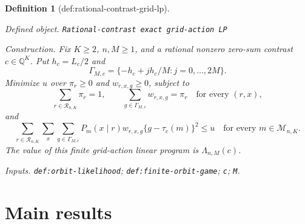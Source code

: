 \documentclass{article}
\newtheorem{definition}{Definition}
\begin{document}
\begin{definition}[def:rational-contrast-grid-lp]\label{def:rational-contrast-grid-lp}
\par\smallskip\noindent\emph{Defined object.} \texttt{Rational-\allowbreak{}contrast exact grid-\allowbreak{}action LP}
\par\smallskip\noindent\emph{Construction.} Fix \(K\geq2\), \(n,M\geq1\), and a rational nonzero zero-sum contrast \(c\in\mathbb Q^K\).  Put \(h_c=L_c/2\) and
\[
 \Gamma_{M,c}=\{-h_c+jh_c/M:j=0,\ldots,2M\}.
\]
Minimize \(u\) over \(\pi_r\geq0\) and \(w_{r,x,g}\geq0\), subject to
\[
 \sum_{r\in\mathcal R_{n,K}}\pi_r=1,
 \qquad
 \sum_{g\in\Gamma_{M,c}}w_{r,x,g}=\pi_r
 \quad\text{for every }(r,x),
\]
and
\[
 \sum_{r\in\mathcal R_{n,K}}\sum_x\sum_{g\in\Gamma_{M,c}}
 P_m(x\mid r)w_{r,x,g}\{g-\tau_c(m)\}^2\leq u
 \quad\text{for every }m\in\mathcal M_{n,K}.
\]
The value of this finite grid-action linear program is \(\Lambda_{n,M}(c)\).
\par\smallskip\noindent\emph{Inputs.} \texttt{def:\allowbreak{}orbit-\allowbreak{}likelihood}; \texttt{def:\allowbreak{}finite-\allowbreak{}orbit-\allowbreak{}game}; \texttt{c}; \texttt{M}.
\end{definition}

\section{Main results}
\end{document}
